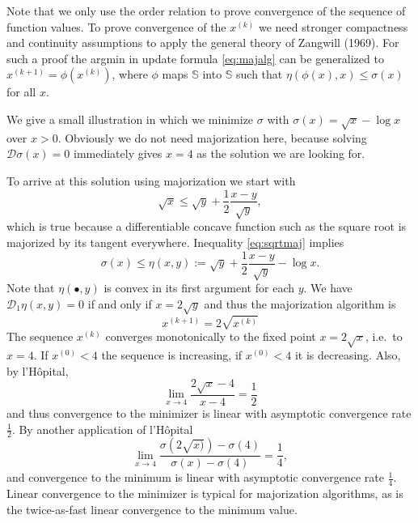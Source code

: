 \documentclass[
  12pt,
]{article}
\begin{document}
Note that we only use the order relation to prove convergence of the
sequence of function values. To prove convergence of the \(x^{(k)}\) we
need stronger compactness and continuity assumptions to apply the
general theory of Zangwill (1969). For such a proof the argmin in update
formula \eqref{eq:majalg} can be generalized to
\(x^{(k+1)}=\phi(x^{(k)})\), where \(\phi\) maps \(\mathbb{S}\) into
\(\mathbb{S}\) such that \(\eta(\phi(x),x)\leq\sigma(x)\) for all \(x\).

We give a small illustration in which we minimize \(\sigma\) with
\(\sigma(x)=\sqrt{x}-\log{x}\) over \(x>0\). Obviously we do not need
majorization here, because solving \(\mathcal{D}\sigma(x)=0\) immediately
gives \(x=4\) as the solution we are looking for.

To arrive at this solution using majorization we start with
\begin{equation}
\sqrt{x}\leq\sqrt{y}+\frac12\frac{x-y}{\sqrt{y}},
\label{eq:sqrtmaj}
\end{equation} which is true because a differentiable concave function
such as the square root is majorized by its tangent everywhere.
Inequality \eqref{eq:sqrtmaj} implies \begin{equation}
\sigma(x)\leq\eta(x,y):=\sqrt{y}+\frac12\frac{x-y}{\sqrt{y}}-\log{x}.
\label{eq:examplemaj}
\end{equation} Note that \(\eta(\bullet,y)\) is convex in its first
argument for each \(y\). We have \(\mathcal{D}_1\eta(x,y)=0\) if and only if
\(x=2\sqrt{y}\) and thus the majorization algorithm is \begin{equation}
x^{(k+1)}=2\sqrt{x^{(k)}}
\label{eq:examplealg}
\end{equation} The sequence \(x^{(k)}\) converges monotonically to the
fixed point \(x=2\sqrt{x}\), i.e.~to \(x=4\). If \(x^{(0)}<4\) the sequence is
increasing, if \(x^{(0)}<4\) it is decreasing. Also, by l'Hôpital,
\begin{equation}
\lim_{x\rightarrow 4}\frac{2\sqrt{x}-4}{x-4}=\frac12
\label{eq:hopi1}
\end{equation} and thus convergence to the minimizer is linear with
asymptotic convergence rate \(\frac12\). By another application of
l'Hôpital \begin{equation}
\lim_{x\rightarrow 4}\frac{\sigma(2\sqrt{x)})-\sigma(4)}{\sigma(x)-\sigma(4)}=\frac14,
\label{eq:hopi2}
\end{equation} and convergence to the minimum is linear with asymptotic
convergence rate \(\frac14\). Linear convergence to the minimizer is
typical for majorization algorithms, as is the twice-as-fast linear
convergence to the minimum value.
\end{document}
